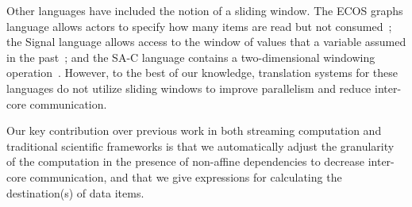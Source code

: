Other languages have included the notion of a sliding window.  The ECOS
graphs language allows actors to specify how many items are read but
not consumed~\cite{huang_ecos_1992}; the Signal language allows access
to the window of values that a variable assumed in the
past~\cite{le_guernic_signal--data_1986}; and the SA-C language
contains a two-dimensional windowing
operation~\cite{draper_compiling_2001}.  However, to the best of our
knowledge, translation systems for these languages do not utilize
sliding windows to improve parallelism and reduce inter-core
communication.

Our key contribution over previous work in both streaming computation
and traditional scientific frameworks is that we automatically adjust
the granularity of the computation in the presence of non-affine
dependencies to decrease inter-core communication, and that we give
expressions for calculating the destination(s) of data items.